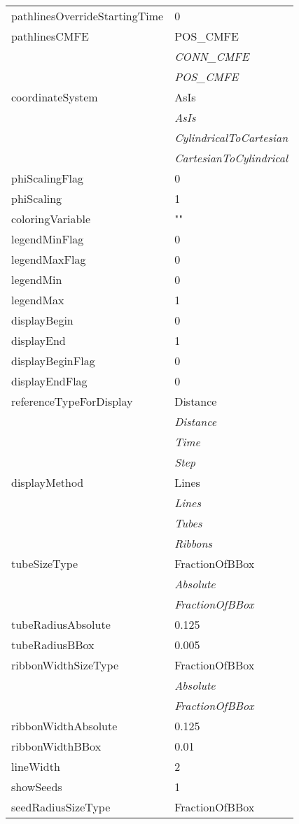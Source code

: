 \documentclass[10pt,a4paper]{report}
\begin{document}
\begin{longtable}{ll}
pathlinesOverrideStartingTime  &  0 \\
pathlinesCMFE  &  POS\_CMFE   \\
 & {\it  CONN\_CMFE} \\
 & {\it  POS\_CMFE} \\
coordinateSystem  &  AsIs   \\
 & {\it  AsIs} \\
 & {\it  CylindricalToCartesian} \\
 & {\it  CartesianToCylindrical} \\
phiScalingFlag  &  0 \\
phiScaling  &  1 \\
coloringVariable  &  "" \\
legendMinFlag  &  0 \\
legendMaxFlag  &  0 \\
legendMin  &  0 \\
legendMax  &  1 \\
displayBegin  &  0 \\
displayEnd  &  1 \\
displayBeginFlag  &  0 \\
displayEndFlag  &  0 \\
referenceTypeForDisplay  &  Distance   \\
 & {\it  Distance} \\
 & {\it  Time} \\
 & {\it  Step} \\
displayMethod  &  Lines   \\
 & {\it  Lines} \\
 & {\it  Tubes} \\
 & {\it  Ribbons} \\
tubeSizeType  &  FractionOfBBox   \\
 & {\it  Absolute} \\
 & {\it  FractionOfBBox} \\
tubeRadiusAbsolute  &  0.125 \\
tubeRadiusBBox  &  0.005 \\
ribbonWidthSizeType  &  FractionOfBBox   \\
 & {\it  Absolute} \\
 & {\it  FractionOfBBox} \\
ribbonWidthAbsolute  &  0.125 \\
ribbonWidthBBox  &  0.01 \\
lineWidth  &  2 \\
showSeeds  &  1 \\
seedRadiusSizeType  &  FractionOfBBox   \\

\end{longtable}
\end{document}
